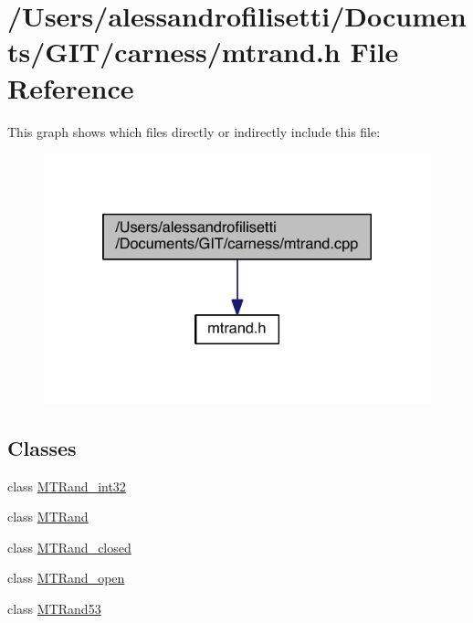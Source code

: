 \hypertarget{a00073}{\section{/\-Users/alessandrofilisetti/\-Documents/\-G\-I\-T/carness/mtrand.h File Reference}
\label{a00073}
}
This graph shows which files directly or indirectly include this file\-:
\nopagebreak
\begin{figure}[H]
\begin{center}
\leavevmode
\includegraphics[width=350pt]{a00193}
\end{center}
\end{figure}
\subsection*{Classes}
\begin{DoxyCompactItemize}
\item 
class \hyperlink{a00019}{M\-T\-Rand\-\_\-int32}
\item 
class \hyperlink{a00016}{M\-T\-Rand}
\item 
class \hyperlink{a00018}{M\-T\-Rand\-\_\-closed}
\item 
class \hyperlink{a00020}{M\-T\-Rand\-\_\-open}
\item 
class \hyperlink{a00017}{M\-T\-Rand53}
\end{DoxyCompactItemize}
